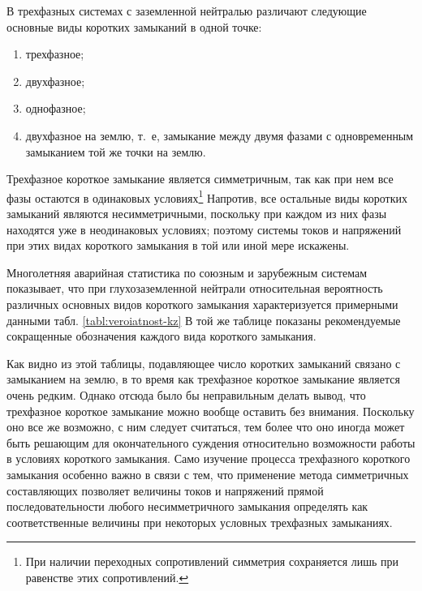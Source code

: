 В трехфазных системах с заземленной нейтралью различают следующие основные виды коротких замыканий в одной точке:

\begin{enumerate} 
	\item
	трехфазное;
	\item
	двухфазное;
	\item
	однофазное;
	\item
	двухфазное на землю, т.~е, замыкание между двумя фазами с одновременным замыканием той же точки на землю. 
\end{enumerate}

Трехфазное короткое замыкание является симметричным, так как при нем все фазы остаются в одинаковых условиях\footnote{При наличии переходных сопротивлений симметрия сохраняется лишь при равенстве этих сопротивлений.} Напротив, все остальные виды коротких замыканий являются несимметричными, поскольку при каждом из них фазы находятся уже в неодинаковых условиях; поэтому системы токов и напряжений при этих видах короткого замыкания в той или иной мере искажены.
	
Многолетняя аварийная статистика по союзным и зарубежным системам показывает, что при глухозаземленной нейтрали относительная вероятность различных основных видов короткого замыкания характеризуется примерными данными табл. \ref{tabl:veroiatnost-kz} В той же таблице показаны рекомендуемые сокращенные обозначения каждого вида короткого замыкания.

Как видно из этой таблицы, подавляющее число коротких замыканий связано с замыканием на землю, в то время как трехфазное короткое замыкание является очень редким. Однако отсюда было бы неправильным делать вывод, что трехфазное короткое замыкание можно вообще оставить без внимания. Поскольку оно все же возможно, с ним следует считаться, тем более что оно иногда может быть решающим для окончательного суждения относительно возможности работы в условиях короткого замыкания. Само изучение процесса трехфазного короткого замыкания особенно важно в связи с тем, что применение метода симметричных составляющих позволяет величины токов и напряжений прямой последовательности любого несимметричного замыкания определять как соответственные величины при некоторых условных трехфазных замыканиях.

